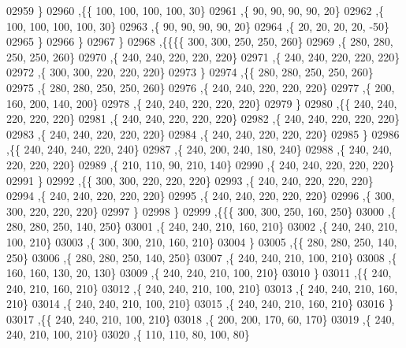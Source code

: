 \begin{DoxyCode}
02959     \}
02960    ,\{\{   100,   100,   100,   100,    30\}
02961     ,\{    90,    90,    90,    90,    20\}
02962     ,\{   100,   100,   100,   100,    30\}
02963     ,\{    90,    90,    90,    90,    20\}
02964     ,\{    20,    20,    20,    20,   -50\}
02965     \}
02966    \}
02967   \}
02968  ,\{\{\{\{   300,   300,   250,   250,   260\}
02969     ,\{   280,   280,   250,   250,   260\}
02970     ,\{   240,   240,   220,   220,   220\}
02971     ,\{   240,   240,   220,   220,   220\}
02972     ,\{   300,   300,   220,   220,   220\}
02973     \}
02974    ,\{\{   280,   280,   250,   250,   260\}
02975     ,\{   280,   280,   250,   250,   260\}
02976     ,\{   240,   240,   220,   220,   220\}
02977     ,\{   200,   160,   200,   140,   200\}
02978     ,\{   240,   240,   220,   220,   220\}
02979     \}
02980    ,\{\{   240,   240,   220,   220,   220\}
02981     ,\{   240,   240,   220,   220,   220\}
02982     ,\{   240,   240,   220,   220,   220\}
02983     ,\{   240,   240,   220,   220,   220\}
02984     ,\{   240,   240,   220,   220,   220\}
02985     \}
02986    ,\{\{   240,   240,   240,   220,   240\}
02987     ,\{   240,   200,   240,   180,   240\}
02988     ,\{   240,   240,   220,   220,   220\}
02989     ,\{   210,   110,    90,   210,   140\}
02990     ,\{   240,   240,   220,   220,   220\}
02991     \}
02992    ,\{\{   300,   300,   220,   220,   220\}
02993     ,\{   240,   240,   220,   220,   220\}
02994     ,\{   240,   240,   220,   220,   220\}
02995     ,\{   240,   240,   220,   220,   220\}
02996     ,\{   300,   300,   220,   220,   220\}
02997     \}
02998    \}
02999   ,\{\{\{   300,   300,   250,   160,   250\}
03000     ,\{   280,   280,   250,   140,   250\}
03001     ,\{   240,   240,   210,   160,   210\}
03002     ,\{   240,   240,   210,   100,   210\}
03003     ,\{   300,   300,   210,   160,   210\}
03004     \}
03005    ,\{\{   280,   280,   250,   140,   250\}
03006     ,\{   280,   280,   250,   140,   250\}
03007     ,\{   240,   240,   210,   100,   210\}
03008     ,\{   160,   160,   130,    20,   130\}
03009     ,\{   240,   240,   210,   100,   210\}
03010     \}
03011    ,\{\{   240,   240,   210,   160,   210\}
03012     ,\{   240,   240,   210,   100,   210\}
03013     ,\{   240,   240,   210,   160,   210\}
03014     ,\{   240,   240,   210,   100,   210\}
03015     ,\{   240,   240,   210,   160,   210\}
03016     \}
03017    ,\{\{   240,   240,   210,   100,   210\}
03018     ,\{   200,   200,   170,    60,   170\}
03019     ,\{   240,   240,   210,   100,   210\}
03020     ,\{   110,   110,    80,   100,    80\}

\end{DoxyCode}
